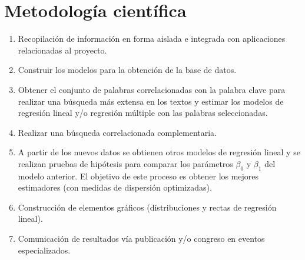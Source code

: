 \section {Metodología científica}
\begin{enumerate}
\item Recopilación de información en forma aislada e integrada con aplicaciones relacionadas al proyecto.
\item Construir los modelos para la obtención de la base de datos.
\item Obtener el conjunto de palabras correlacionadas con la palabra clave para realizar una búsqueda más extensa en los textos y estimar los modelos de regresión lineal y/o regresión múltiple con las palabras seleccionadas.
\item Realizar una búsqueda correlacionada complementaria.
\item A partir de los nuevos datos se obtienen otros modelos de regresión lineal y se realizan pruebas de hipótesis para comparar los parámetros $\beta_0$ y $\beta_1$ del modelo anterior. El objetivo de este proceso es obtener los mejores estimadores (con medidas de dispersión optimizadas).
\item Construcción de elementos gráficos (distribuciones y rectas de regresión lineal).
\item Comunicación de resultados vía publicación y/o congreso en eventos especializados.
\end{enumerate}
